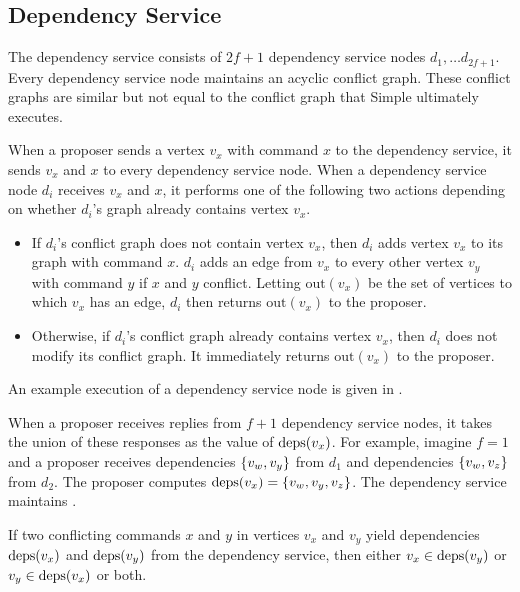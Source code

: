 \subsection{Dependency Service}
The dependency service consists of $2f+1$ dependency service nodes $d_1, \ldots
d_{2f+1}$. Every dependency service node maintains an acyclic conflict graph.
These conflict graphs are similar but not equal to the conflict graph that
Simple \BPaxos{} ultimately executes.

\newcommand{\out}[1]{\text{out}(#1)}
When a proposer sends a vertex $v_x$ with command $x$ to the dependency
service, it sends $v_x$ and $x$ to every dependency service node. When a
dependency service node $d_i$ receives $v_x$ and $x$, it performs one of the
following two actions depending on whether $d_i$'s graph already contains
vertex $v_x$.
\begin{itemize}
  \item
    If $d_i$'s conflict graph does not contain vertex $v_x$, then $d_i$ adds
    vertex $v_x$ to its graph with command $x$. $d_i$ adds an edge from $v_x$
    to every other vertex $v_y$ with command $y$ if $x$ and $y$ conflict.
    Letting $\out{v_x}$ be the set of vertices to which $v_x$ has an edge,
    $d_i$ then returns $\out{v_x}$ to the proposer.

  \item
    Otherwise, if $d_i$'s conflict graph already contains vertex $v_x$, then
    $d_i$ does not modify its conflict graph. It immediately returns
    $\out{v_x}$ to the proposer.
\end{itemize}
An example execution of a dependency service node is given in
.

When a proposer receives replies from $f+1$ dependency service nodes, it
takes the union of these responses as the value of $\text{deps}(v_x)$. For example,
imagine $f= 1$ and a proposer receives dependencies $\{v_w, v_y\}$ from $d_1$
and dependencies $\{v_w, v_z\}$ from $d_2$. The proposer computes $\text{deps}(v_x)
= \{v_w, v_y, v_z\}$. The dependency service maintains
.

{}

\begin{invariant}
If two conflicting commands $x$ and $y$ in vertices $v_x$ and $v_y$ yield
dependencies $\text{deps}(v_x)$ and $\text{deps}(v_y)$ from the dependency service, then
either $v_x \in \text{deps}(v_y)$ or $v_y \in \text{deps}(v_x)$ or both.
\end{invariant}

